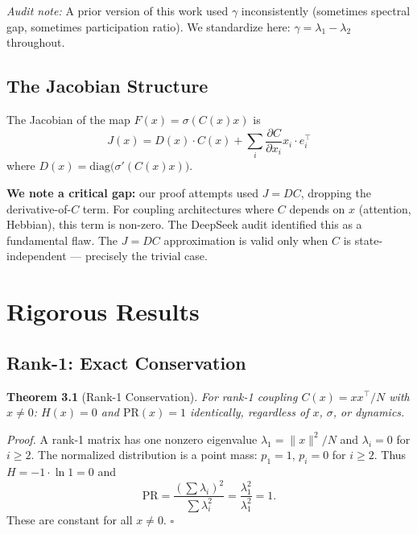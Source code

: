 \documentclass[11pt]{article}
\begin{document}
\textit{Audit note:} A prior version of this work used $\gamma$ inconsistently (sometimes spectral gap, sometimes participation ratio). We standardize here: $\gamma = \lambda_1 - \lambda_2$ throughout.

\subsection{The Jacobian Structure}

The Jacobian of the map $F(x) = \sigma(C(x)x)$ is
\begin{equation}
  J(x) = D(x) \cdot C(x) + \sum_i \frac{\partial C}{\partial x_i} x_i \cdot e_i^\top
\end{equation}
where $D(x) = \mathrm{diag}\bigl(\sigma'(C(x)x)\bigr)$.

\textbf{We note a critical gap:} our proof attempts used $J = DC$, dropping the derivative-of-$C$ term. For coupling architectures where $C$ depends on $x$ (attention, Hebbian), this term is non-zero. The DeepSeek audit identified this as a fundamental flaw. The $J = DC$ approximation is valid only when $C$ is state-independent --- precisely the trivial case.

\section{Rigorous Results}

\subsection{Rank-1: Exact Conservation}

\textbf{Theorem 3.1} (Rank-1 Conservation). \textit{For rank-1 coupling $C(x) = xx^\top/N$ with $x \neq 0$: $H(x) = 0$ and $\mathrm{PR}(x) = 1$ identically, regardless of $x$, $\sigma$, or dynamics.}

\textit{Proof.} A rank-1 matrix has one nonzero eigenvalue $\lambda_1 = \|x\|^2/N$ and $\lambda_i = 0$ for $i \geq 2$. The normalized distribution is a point mass: $p_1 = 1$, $p_i = 0$ for $i \geq 2$. Thus $H = -1 \cdot \ln 1 = 0$ and
\begin{equation}
  \mathrm{PR} = \frac{(\sum \lambda_i)^2}{\sum \lambda_i^2} = \frac{\lambda_1^2}{\lambda_1^2} = 1.
\end{equation}
These are constant for all $x \neq 0$. $\square$
\end{document}
